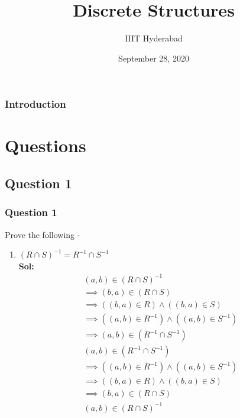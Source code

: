 \documentclass[xcolor=svgnames]{beamer}
\title[Discrete Structures]{Discrete Structures} %
\author{IIIT Hyderabad} %
\institute[] %
{
Monsoon 2020 \\ %
\medskip
\textit{Tutorial 4} %
}
\date{September 28, 2020} %
\begin{document}
\begin{frame}
\titlepage %
\end{frame}

\begin{frame}
\frametitle{Introduction} %
\tableofcontents %
\end{frame}



\section{Questions}

\subsection{Question 1}
\begin{frame}
\frametitle{Question 1}
Prove the following - 
\begin{enumerate}
    \item  $(R \cap S)^{-1} = R^{-1} \cap S^{-1}$
    \\ \textbf{Sol:}
    \begin{align*}
        & (a,b) \in {(R \cap S)}^{-1} & 
        \\ & \implies (b,a) \in (R \cap S) &
        \\ & \implies ((b,a) \in R) \land ((b,a) \in S) &
        \\ & \implies ((a,b) \in R^{-1}) \land ((a,b) \in S^{-1}) &
        \\ & \implies (a,b) \in (R^{-1} \cap S^{-1}) &
    \end{align*}
    \begin{align*}
        & (a,b) \in (R^{-1} \cap S^{-1}) & 
        \\ & \implies ((a,b) \in R^{-1}) \land ((a,b) \in S^{-1}) &
        \\ & \implies ((b,a) \in R) \land ((b,a) \in S) &
        \\ & \implies (b,a) \in (R \cap S) &
        \\ & (a,b) \in {(R \cap S)}^{-1} &
    \end{align*}    
\end{enumerate}
\end{frame}
\end{document}

